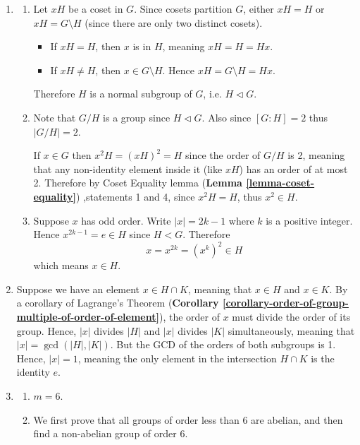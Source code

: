\begin{enumerate}
    \item \begin{enumerate}[label=(\roman*)]
        \item Let $xH$ be a coset in $G$. Since cosets partition $G$, either $xH = H$ or $xH = G \setminus H$ (since there are only two distinct cosets).
    \begin{itemize}
            \item If $xH = H$, then $x$ is in $H$, meaning $xH = H = Hx$.
            \item If $xH \neq H$, then $x \in G \setminus H$. Hence $xH = G \setminus H = Hx$.
    \end{itemize}
    Therefore $H$ is a normal subgroup of $G$, i.e. $H \lhd G$.
        \item Note that $G/H$ is a group since $H \lhd G$. Also since $[G:H] = 2$ thus $|G/H| = 2$.
        
        If $x \in G$ then $x^2H = (xH)^2 = H$ since the order of $G/H$ is 2, meaning that any non-identity element inside it (like $xH$) has an order of at most 2. Therefore by Coset Equality lemma (\textbf{Lemma \ref{lemma-coset-equality}}) ,statements 1 and 4, since $x^2H = H$, thus $x^2 \in H$.
        
        \item Suppose $x$ has odd order. Write $|x| = 2k - 1$ where $k$ is a positive integer. Hence $x^{2k-1} = e \in H$ since $H < G$. Therefore
        \[
            x = x^{2k} = \left(x^k\right)^2 \in H        
        \]
        which means $x \in H$.
    \end{enumerate}

    \item Suppose we have an element $x \in H \cap K$, meaning that $x \in H$ and $x \in K$. By a corollary of Lagrange's Theorem (\textbf{Corollary \ref{corollary-order-of-group-multiple-of-order-of-element}}), the order of $x$ must divide the order of its group. Hence, $|x|$ divides $|H|$ and $|x|$ divides $|K|$ simultaneously, meaning that $|x| = \gcd(|H|, |K|)$. But the GCD of the orders of both subgroups is 1. Hence, $|x| = 1$, meaning the only element in the intersection $H \cap K$ is the identity $e$.

    \item \begin{enumerate}[label=(\alph*)]
        \item $m = 6$.
        \item We first prove that all groups of order less than 6 are abelian, and then find a non-abelian group of order 6.


\end{enumerate}
\end{enumerate}

